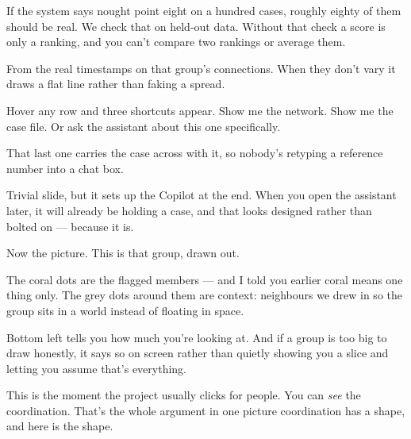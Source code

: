 \documentclass[11pt]{article}
\begin{document}
\begin{asked}
 If the system says nought point eight
on a hundred cases, roughly eighty of them should be real. We check that on
held-out data. Without that check a score is only a ranking, and you can't
compare two rankings or average them.

 From the real timestamps on that
group's connections. When they don't vary it draws a flat line rather than
faking a spread.
\end{asked}


\begin{saythis}
Hover any row and three shortcuts appear. Show me the network. Show me the case
file. Or ask the assistant about this one specifically.

That last one carries the case across with it, so nobody's retyping a reference
number into a chat box.
\end{saythis}

\begin{means}
Trivial slide, but it sets up the Copilot at the end. When you open the
assistant later, it will already be holding a case, and that looks designed
rather than bolted on --- because it is.
\end{means}



\begin{saythis}
Now the picture. This is that group, drawn out.

The coral dots are the flagged members --- and I told you earlier coral means
one thing only. The grey dots around them are context: neighbours we drew in so
the group sits in a world instead of floating in space.

Bottom left tells you how much you're looking at. And if a group is too big to
draw honestly, it says so on screen rather than quietly showing you a slice and
letting you assume that's everything.

This is the moment the project usually clicks for people. You can \emph{see}
the coordination. That's the whole argument in one picture \bt coordination has
a shape, and here is the shape.
\end{saythis}
\end{document}
